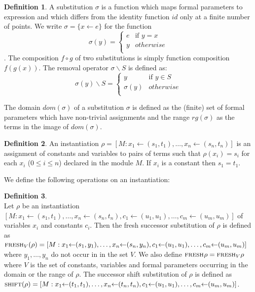 \documentclass[a4paper]{article}
\newcommand{\inst}[2]{#1 {\leftarrow} #2}
\newcommand{\fpsubstin}[1]{\{#1\}}
\newcommand{\fpscat}[0]{\circ}
\newcommand{\substin}[2]{[#1:#2]}
\newcommand{\fpwith}{\leftarrow}
\newcommand{\fpwithout}[0]{\backslash}
\newcommand{\stshift}{\mbox{\sc shift}}
\newcommand{\stfresh}[1]{\mbox{\sc fresh$_{#1}$}}
\theoremstyle{definition}
\newtheorem{definition}{Definition}
\begin{document}
 \begin{definition}
   A substitution $\sigma$ is a function which maps formal parameters
   to expression and which differs from the identity function $id$
   only at a finite number of points. We write
   $\sigma=\fpsubstin{x \fpwith e}$ for the function
   \[\sigma(y)=\left\{
       \begin{array}{ll}
         e& \mbox{if }y = x\\
         y & otherwise\\
       \end{array}\right.
   \]. The composition $f \fpscat g$ of two substitutions is simply
   function composition $f(g(x))$. The removal operator
   $\sigma\fpwithout S$ is defined as:
   \[\sigma(y)\fpwithout S = \left\{
       \begin{array}{ll}
         y &\mbox{if }y \in S\\
         \sigma(y) & otherwise\\
       \end{array}\right.
   \]

   The domain $dom(\sigma)$ of a substitution $\sigma$ is defined as
   the (finite) set of formal parameters which have non-trivial
   assignments and the range $rg(\sigma)$ as the terms in the image of
   $dom(\sigma)$.
 \end{definition}

\begin{definition}
  An instantiation $\rho=\substin{M}{\inst{x_1}{(s_1,t_1)},
  \ldots, \inst{x_n}{(s_n,t_n)}}$ is an assignment of constants and variables to
  pairs of terms such that $\rho(x_i)=s_i$ for each $x_i$ ($0 \leq i \leq n$)
  declared in the module $M$. If $x_i$ is a constant then $s_1 = t_1$.
\end{definition}

We define the following operations on an instantiation:

\begin{definition}\mbox{ }\\
Let $\rho$ be an instantiation $\substin{M}{\inst{x_1}{(s_1,t_1)}, \ldots,
  \inst{x_n}{(s_n,t_n)}, \inst{c_1}{(u_1,u_1)},\ldots,\inst{c_m}{(u_m,u_m)} }$ of
 variables $x_i$ and constants $c_i$.
Then the fresh successor substitution of $\rho$ is defined as
 $\stfresh{V}(\rho) = \substin{M}{\inst{x_1}{(s_1,y_1)}, \ldots,
  \inst{x_n}{(s_n,y_n)}, \inst{c_1}{(u_1,u_1)},\ldots,\inst{c_m}{(u_m,u_m)} }$
 where $y_1,\ldots,y_n$ do not occur in
 in the set $V$.
 We also define $\stfresh{}{\rho}=\stfresh{V}{\rho}$ where $V$ is the set
 of constants, variables and formal parameters occurring in the domain or the
 range of $\rho$.
The successor shift substitution of $\rho$ is defined as  $\stshift(\rho) =
 \substin{M}{ \inst{x_1}{ (t_1,t_1)}, \ldots, \inst{x_n}{(t_n,t_n)},
   \inst{c_1}{(u_1,u_1), \ldots, \inst{c_m}{(u_m,u_m)} } }$.
\end{definition}
\end{document}
